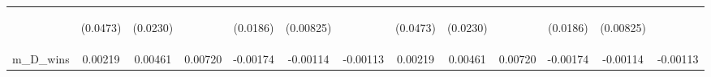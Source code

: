 \documentclass[]{article}
\begin{document}
\begin{center}
\begin{tabular}{lcccccccccccc}
\vspace{4pt} & \begin{footnotesize}(0.0473)\end{footnotesize} & \begin{footnotesize}(0.0230)\end{footnotesize} & \begin{footnotesize}\end{footnotesize} & \begin{footnotesize}(0.0186)\end{footnotesize} & \begin{footnotesize}(0.00825)\end{footnotesize} & \begin{footnotesize}\end{footnotesize} & \begin{footnotesize}(0.0473)\end{footnotesize} & \begin{footnotesize}(0.0230)\end{footnotesize} & \begin{footnotesize}\end{footnotesize} & \begin{footnotesize}(0.0186)\end{footnotesize} & \begin{footnotesize}(0.00825)\end{footnotesize} & \begin{footnotesize}\end{footnotesize} \\
m\_D\_wins & 0.00219 & 0.00461 & 0.00720 & -0.00174 & -0.00114 & -0.00113 & 0.00219 & 0.00461 & 0.00720 & -0.00174 & -0.00114 & -0.00113 \\

\end{tabular}
\end{center}
\end{document}
